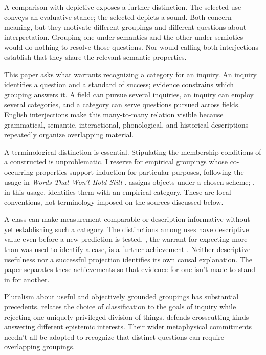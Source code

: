 \documentclass[12pt]{article}
\begin{document}
A comparison with depictive  exposes a further distinction.
The selected  use conveys an evaluative stance; the selected
 depicts a sound. Both concern meaning, but they motivate
different groupings and different questions about interpretation. Grouping
one under semantics and the other under semiotics would do nothing to
resolve those questions. Nor would calling both interjections establish
that they share the relevant semantic properties.

This paper asks what warrants recognizing a category for an inquiry.
An inquiry identifies a question and a standard of success; evidence
constrains which grouping answers it. A field can pursue several inquiries,
an inquiry can employ several categories, and a category can serve questions
pursued across fields. English interjections make this many-to-many relation
visible because grammatical, semantic, interactional, phonological, and
historical descriptions repeatedly organize overlapping material.

A terminological distinction is essential. Stipulating the membership
conditions of a constructed  is unproblematic. I reserve
 for empirical groupings whose co-occurring properties support
induction for particular purposes, following the usage in
\textit{Words That Won't Hold Still} \citep[ch.~2]{reynolds2025hpcbook}.
 assigns objects under a chosen scheme;
, in this usage, identifies them with an empirical
category. These are local conventions, not terminology imposed on the
sources discussed below.

A class can make measurement comparable or description informative without
yet establishing such a category. The distinctions among 
uses have descriptive value even before a new prediction is tested.
, the warrant for expecting more than was used to
identify a case, is a further achievement \citep{Goodman1955}.
Neither descriptive usefulness nor a successful projection identifies its
own causal explanation. The paper separates these achievements so that
evidence for one isn't made to stand in for another.

Pluralism about useful and objectively grounded groupings has substantial
precedents. \textcite[5--7, 17--18]{dupre1993disorder} relates the choice of
classification to the goals of inquiry while rejecting one uniquely
privileged division of things. \textcite[63--64, 69--72]{khalidi2013}
defends crosscutting kinds answering different epistemic interests.
Their wider metaphysical commitments needn't all be adopted to recognize
that distinct questions can require overlapping groupings.
\end{document}
